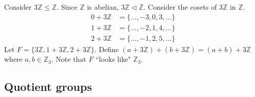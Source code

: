 \documentclass[12pt]{article}
\newcommand{\Z}{\mathbb{Z}}
\begin{document}
	\begin{myex}{}{}
		Consider $3\Z\leq \Z$. Since $\Z$ is abelian, $3\Z\lhd\Z$. Consider the cosets of $3\Z$ in $\Z$.
		\begin{align*}
			0+3\Z&=\{\dots, -3, 0, 3, \dots\}\\
			1+3\Z&=\{\dots, -2, 1, 4, \dots\}\\
			2+3\Z&=\{\dots, -1, 2, 5, \dots\}
		\end{align*}
		Let $F=\{3\Z, 1+3\Z, 2+3\Z\}$. Define $(a+3\Z)+(b+3\Z)=(a+b)+3\Z$ where $a, b\in\Z_3$. Note that $F$ ``looks like" $\Z_3$.
	\end{myex}
	
	\subsection{Quotient groups}
\end{document}
